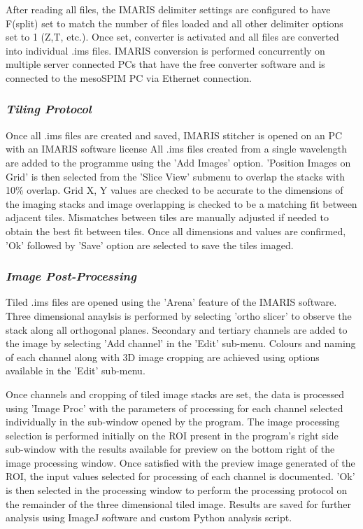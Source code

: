 After reading all files, the IMARIS delimiter settings are configured to have F(split) set to match the number of files loaded and all other delimiter options set to 1 (Z,T, etc.). Once set, converter is activated and all files are converted into individual .ims files. IMARIS conversion is performed concurrently on multiple server connected PCs that have the free converter software and is connected to the mesoSPIM PC via Ethernet connection.

\subsubsection{\textit{Tiling Protocol}}
Once all .ims files are created and saved, IMARIS stitcher is opened on an PC with an IMARIS software license All .ims files created from a single wavelength are added to the programme using the 'Add Images' option. 'Position Images on Grid' is then selected from the 'Slice View' submenu to overlap the stacks with 10\% overlap. Grid X, Y values are checked to be accurate to the dimensions of the imaging stacks and image overlapping is checked to be a matching fit between adjacent tiles. Mismatches between tiles are manually adjusted if needed to obtain the best fit between tiles. Once all dimensions and values are confirmed, 'Ok' followed by 'Save' option are selected to save the tiles imaged.   


\subsubsection{\textit{Image Post-Processing}}
Tiled .ims files are opened using the 'Arena' feature of the IMARIS software. Three dimensional anaylsis is performed by selecting 'ortho slicer' to observe the stack along all orthogonal planes. Secondary and tertiary channels are added to the image by selecting 'Add channel' in the 'Edit' sub-menu. Colours and naming of each channel along with 3D image cropping are achieved using options available in the 'Edit' sub-menu.

Once channels and cropping of tiled image stacks are set, the data is processed using 'Image Proc' with the parameters of processing for each channel selected individually in the sub-window opened by the program. The image processing selection is performed initially on the ROI present in the program's right side sub-window with the results available for preview on the bottom right of the image processing window. Once satisfied with the preview image generated of the ROI, the input values selected for processing of each channel is documented. 'Ok' is then selected in the processing window to perform the processing protocol on the remainder of the three dimensional tiled image. Results are saved for further analysis using ImageJ software and custom Python analysis script.


